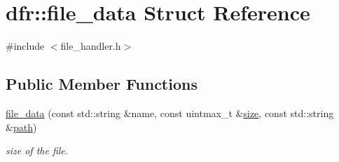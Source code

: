\hypertarget{structdfr_1_1file__data}{}\section{dfr\+:\+:file\+\_\+data Struct Reference}
\label{structdfr_1_1file__data}


{\ttfamily \#include $<$file\+\_\+handler.\+h$>$}

\subsection*{Public Member Functions}
\begin{DoxyCompactItemize}
\item 
\hyperlink{structdfr_1_1file__data_a7c0c7de83cd3104896d2e2b5a105bfab}{file\+\_\+data} (const std\+::string \&name, const uintmax\+\_\+t \&\hyperlink{structdfr_1_1file__data_a4fbf33ba9872a4fc575ef911e5a8f80c}{size}, const std\+::string \&\hyperlink{structdfr_1_1file__data_a49e1a762af0cfc8dd25669a1c17340da}{path})
\begin{DoxyCompactList}\small\item\em size of the file. \end{DoxyCompactList}\end{DoxyCompactItemize}
